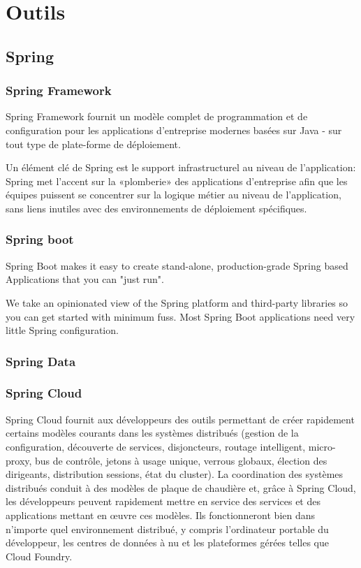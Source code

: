 \section{Outils}
 \subsection{Spring}
 
  \subsubsection{Spring Framework }
  
  
  Spring Framework fournit un modèle complet de programmation et de configuration pour les applications d'entreprise modernes basées sur Java - sur tout type de plate-forme de déploiement.
  
  Un élément clé de Spring est le support infrastructurel au niveau de l’application: Spring met l’accent sur la «plomberie» des applications d’entreprise afin que les équipes puissent se concentrer sur la logique métier au niveau de l’application, sans liens inutiles avec des environnements de déploiement spécifiques.
  
 \subsubsection{Spring boot}
 Spring Boot makes it easy to create stand-alone, production-grade Spring based Applications that you can "just run".
 
 We take an opinionated view of the Spring platform and third-party libraries so you can get started with minimum fuss. Most Spring Boot applications need very little Spring configuration.
   \subsubsection{Spring Data}
   
 \subsubsection{Spring Cloud}
 Spring Cloud fournit aux développeurs des outils permettant de créer rapidement certains modèles courants dans les systèmes distribués (gestion de la configuration, découverte de services, disjoncteurs, routage intelligent, micro-proxy, bus de contrôle, jetons à usage unique, verrous globaux, élection des dirigeants, distribution sessions, état du cluster). La coordination des systèmes distribués conduit à des modèles de plaque de chaudière et, grâce à Spring Cloud, les développeurs peuvent rapidement mettre en service des services et des applications mettant en œuvre ces modèles. Ils fonctionneront bien dans n’importe quel environnement distribué, y compris l’ordinateur portable du développeur, les centres de données à nu et les plateformes gérées telles que Cloud Foundry.
 
